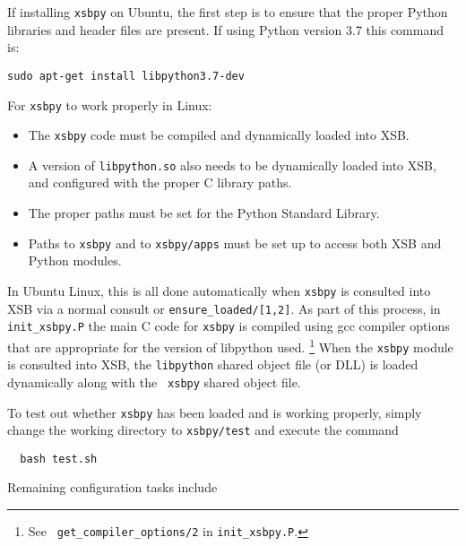 If installing {\tt xsbpy} on Ubuntu, the first step is to ensure that
the proper Python libraries and header files are present.  If using
Python version 3.7 this command is:

{\tt sudo apt-get install libpython3.7-dev}

For {\tt xsbpy} to work properly in Linux:
\begin{itemize}
\item The {\tt xsbpy} code must be compiled and dynamically loaded into XSB.
\item A version of {\tt libpython.so} also needs to be dynamically
  loaded into XSB, and configured with the proper C library paths.
\item The proper paths must be set for the Python Standard Library.
\item Paths to {\tt xsbpy} and to {\tt xsbpy/apps} must be set up to
  access both XSB and Python modules.
\end{itemize}

In Ubuntu Linux, this is all done automatically when {\tt xsbpy} is
consulted into XSB via a normal consult or {\tt ensure\_loaded/[1,2]}.
As part of this process, in {\tt init\_xsbpy.P} the main C code for
{\tt xsbpy} is compiled using gcc compiler options that are
appropriate for the version of libpython used. \footnote{See {\tt
    get\_compiler\_options/2} in {\tt init\_xsbpy.P}.}
When the {\tt xsbpy} module is consulted into XSB, the {\tt libpython}
shared object file (or DLL) is loaded dynamically along with the {\tt
  xsbpy} shared object file.


\noindent

To test out whether {\tt xsbpy} has been loaded and is working
properly, simply change the working directory to {\tt xsbpy/test} and
execute the command

\begin{verbatim}
  bash test.sh
\end{verbatim}

Remaining configuration tasks include

